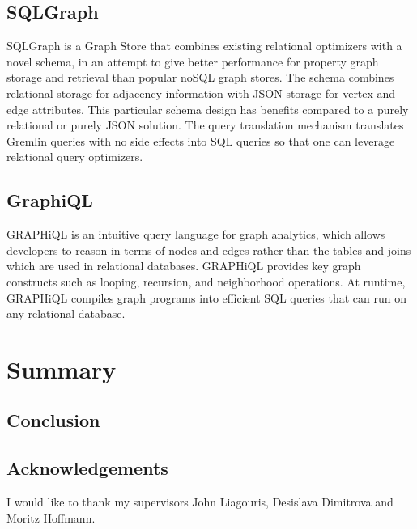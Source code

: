 \documentclass[11pt,singlecolumn]{scrartcl}
\begin{document}
\clearpage

\subsection{SQLGraph}
SQLGraph is a Graph Store that combines existing relational optimizers with a novel schema, in an attempt to give better performance for property graph storage and retrieval than popular noSQL graph stores. The schema combines relational storage for adjacency information with JSON storage for vertex and edge attributes. This particular schema design has benefits compared to a purely relational or purely JSON solution. The query translation mechanism translates Gremlin queries with no side effects into SQL queries so that one can leverage relational query optimizers. \cite{Sun:2015}

\clearpage

\subsection{GraphiQL}
GRAPHiQL is an intuitive query language for graph analytics, which allows developers to reason in terms of nodes and edges rather than the tables and joins which are used in relational databases. GRAPHiQL provides key graph constructs such as looping, recursion, and neighborhood operations. At runtime, GRAPHiQL compiles graph programs into efficient SQL queries that can run on any relational database. \cite {Graphiql}

\clearpage

\section{Summary}

\subsection{Conclusion}

\subsection{Acknowledgements}
I would like to thank my supervisors John Liagouris, Desislava Dimitrova and Moritz Hoffmann.

\clearpage


{}

\end{document}

